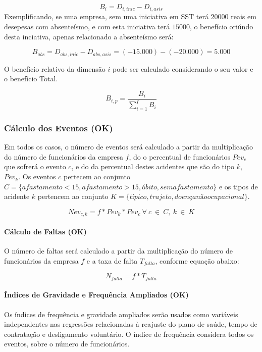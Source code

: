 \documentclass[]{article}
\let\oldparagraph\paragraph
\renewcommand{\paragraph}[1]{\oldparagraph{#1}\mbox{}}
\begin{document}
\[B_i = {D}_{i, inic} - {D}_{i, asis}\] Exemplificando, se uma empresa,
sem uma iniciativa em SST terá \(20000\) reais em desepesas com
absenteísmo, e com esta iniciativa terá \(15000\), o benefício oriúndo
desta inciativa, apenas relacionado a absenteísmo será:

\[B_{abs} = {D}_{abs, inic} - {D}_{abs, asis} = (-15.000)-(-20.000) = 5.000\]

O benefício relativo da dimensão \(i\) pode ser calculado considerando o
seu valor e o benefício Total.

\[B_{i,p} = \frac{B_{i}}{\sum_{i=1}^{I} B_{i}}\]

\subsubsection{Cálculo dos Eventos (OK)}\label{calculo-dos-eventos-ok}

Em todos os casos, o número de eventos será calculado a partir da
multiplicação do número de funcionários da empresa \(f\), do o
percentual de funcionários \(Pev_c\) que sofrerá o evento \(c\), e do da
percentual destes acidentes que são do tipo \(k\), \(Pev_{k}\). Os
eventos \(c\) pertecem ao conjunto
\(C =\{afastamento<15, afastamento>15, óbito, sem afastamento\}\) e os
tipos de acidente \(k\) pertencem ao conjunto
\(K= \{típico, trajeto, doença não ocupacional\}\).

\[Nev_{c,k}= f * Pev_{k} * Pev_{c} \ \forall \ c \  \in \ C,  \ k \  \in \ K\]

\paragraph{Cálculo de Faltas (OK)}\label{calculo-de-faltas-ok}

O número de faltas será calculado a partir da multiplicação do número de
funcionários da empresa \(f\) e a taxa de falta \(T_{falta}\), conforme
equação abaixo:

\[N_{falta} = f * T_{falta}\]

\paragraph{Índices de Gravidade e Frequência Ampliados
(OK)}\label{indices-de-gravidade-e-frequencia-ampliados-ok}

Os índices de frequência e gravidade ampliados serão usados como
variáveis independentes nas regressões relacionadas à reajuste do plano
de saúde, tempo de contratação e desligamento voluntário. O índice de
frequência considera todos os eventos, sobre o número de funcionários.
\end{document}
